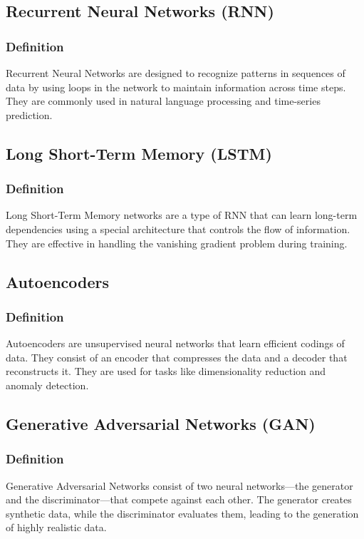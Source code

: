 \subsection{Recurrent Neural Networks (RNN)}
\subsubsection{Definition}
Recurrent Neural Networks are designed to recognize patterns in sequences of data by using loops in the network to maintain information across time steps. They are commonly used in natural language processing and time-series prediction.

\subsection{Long Short-Term Memory (LSTM)}
\subsubsection{Definition}
Long Short-Term Memory networks are a type of RNN that can learn long-term dependencies using a special architecture that controls the flow of information. They are effective in handling the vanishing gradient problem during training.

\subsection{Autoencoders}
\subsubsection{Definition}
Autoencoders are unsupervised neural networks that learn efficient codings of data. They consist of an encoder that compresses the data and a decoder that reconstructs it. They are used for tasks like dimensionality reduction and anomaly detection.

\subsection{Generative Adversarial Networks (GAN)}
\subsubsection{Definition}
Generative Adversarial Networks consist of two neural networks—the generator and the discriminator—that compete against each other. The generator creates synthetic data, while the discriminator evaluates them, leading to the generation of highly realistic data.
